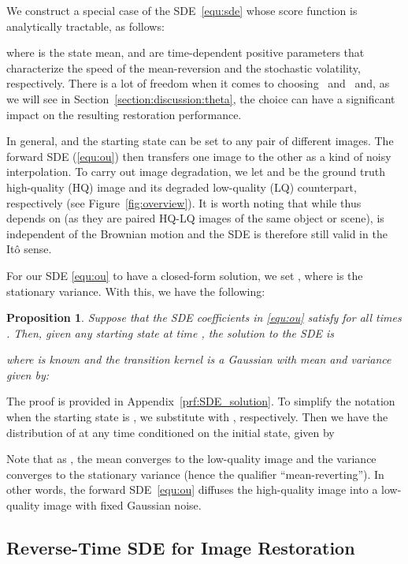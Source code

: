 \documentclass{article}
\theoremstyle{plain}
\newtheorem{proposition}[theorem]{Proposition}
\theoremstyle{definition}
\theoremstyle{remark}
\begin{document}
We construct a special case of the SDE~\eqref{equ:sde} whose score function is analytically tractable, as follows:

where  is the state mean, and  are time-dependent positive parameters that characterize the speed of the mean-reversion and the stochastic volatility, respectively. There is a lot of freedom when it comes to choosing~ and~ and, as we will see in Section~\ref{section:discussion:theta}, the choice can have a significant impact on the resulting restoration performance. 

In general,  and the starting state  can be set to any pair of different images. The forward SDE (\ref{equ:ou}) then transfers one image to the other as a kind of noisy interpolation. To carry out image degradation, we let  and  be the ground truth high-quality (HQ) image and its degraded low-quality (LQ) counterpart, respectively (see Figure~\ref{fig:overview}). It is worth noting that while  thus depends on  (as they are paired HQ-LQ images of the same object or scene),  is independent of the Brownian motion and the SDE is therefore still valid in the It\^{o} sense.

For our SDE \eqref{equ:ou} to have a closed-form solution, we set , where  is the stationary variance. With this, we have the following:

\begin{proposition}
    Suppose that the SDE coefficients in \eqref{equ:ou} satisfy  for all times . Then, given any starting state  at time , the solution to the SDE is

where  is known and the transition kernel  is a Gaussian with mean  and variance  given by:
    
\label{prop:forward_sde_solution}
\end{proposition}

The proof is provided in Appendix~\ref{prf:SDE_solution}. To simplify the notation when the starting state is , we substitute  with , respectively. 
Then we have the distribution of  at any time  conditioned on the initial state, given by

Note that as , the mean  converges to the low-quality image  and the variance  converges to the stationary variance  (hence the qualifier ``mean-reverting''). In other words, the forward SDE~\eqref{equ:ou} diffuses the high-quality image into a low-quality image with fixed Gaussian noise.

 

\subsection{Reverse-Time SDE for Image Restoration}
\end{document}
